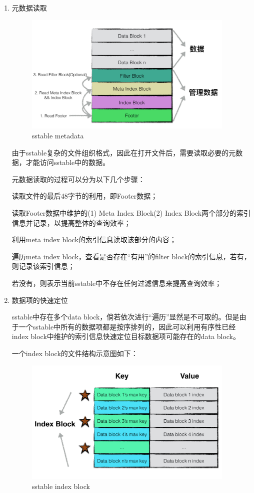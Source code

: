 \begin{enumerate}
\begin{enumerate}
\begin{enumerate}
			\item 元数据读取 
			

			\begin{figure}[H]
				\centering
				\includegraphics[width=0.95\textwidth]{images/sstable_metadata.jpeg}
				\caption{sstable metadata}
				\label{sstable_metadata}
			\end{figure}
			由于sstable复杂的文件组织格式，因此在打开文件后，需要读取必要的元数据，才能访问sstable中的数据。

元数据读取的过程可以分为以下几个步骤：

读取文件的最后48字节的利用，即Footer数据；

读取Footer数据中维护的(1) Meta Index Block(2) Index Block两个部分的索引信息并记录，以提高整体的查询效率；

利用meta index block的索引信息读取该部分的内容；

遍历meta index block，查看是否存在“有用”的filter block的索引信息，若有，则记录该索引信息；

若没有，则表示当前sstable中不存在任何过滤信息来提高查询效率；

			\item 数据项的快速定位 
			
			sstable中存在多个data block，倘若依次进行“遍历”显然是不可取的。但是由于一个sstable中所有的数据项都是按序排列的，因此可以利用有序性已经index block中维护的索引信息快速定位目标数据项可能存在的data block。

一个index block的文件结构示意图如下：

\begin{figure}[H]
	\centering
	\includegraphics[width=0.95\textwidth]{images/indexblock.jpeg}
	\caption{sstable index block}
	\label{sstable_index_block}
\end{figure}


\end{enumerate}
\end{enumerate}
\end{enumerate}
